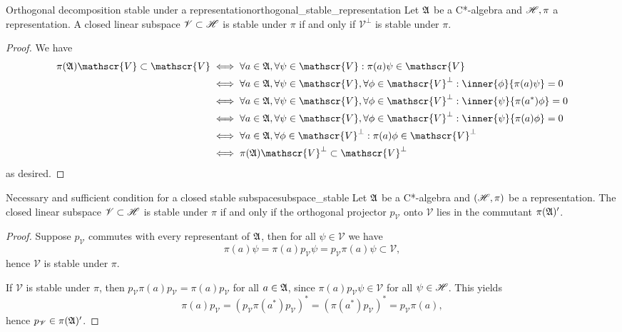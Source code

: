 \begin{proposition}{Orthogonal decomposition stable under a representation}{orthogonal_stable_representation}
    Let \(\mathfrak{A}\) be a C*-algebra and \(\mathscr{H}, \pi\) a representation. A closed linear subspace \(\mathscr{V}\subset \mathscr{H}\) is stable under \(\pi\) if and only if \(\mathscr{V}^{\perp}\) is stable under \(\pi\).
\end{proposition}
\begin{proof}
    We have
    \begin{align*}
        \pi(\algebra{A})\mathscr{V} \subset \mathscr{V}
        &\iff
        \forall a \in \algebra{A}, \forall \psi \in \mathscr{V} : \pi(a)\psi \in \mathscr{V}\\
        &\iff
        \forall a \in \algebra{A}, \forall \psi \in \mathscr{V}, \forall \phi \in \mathscr{V}^{\perp} : \inner{\phi}{\pi(a)\psi} = 0\\
        &\iff
        \forall a \in \algebra{A}, \forall \psi \in \mathscr{V}, \forall \phi \in \mathscr{V}^{\perp}: \inner{\psi}{\pi(a^*)\phi} = 0\\
        &\iff
        \forall a \in \algebra{A}, \forall \psi \in \mathscr{V}, \forall \phi \in \mathscr{V}^{\perp}: \inner{\psi}{\pi(a)\phi} = 0\\
        &\iff
        \forall a \in \algebra{A},\forall \phi \in \mathscr{V}^{\perp} : \pi(a)\phi \in \mathscr{V}^{\perp}\\
        &\iff
        \pi(\algebra{A})\mathscr{V}^{\perp} \subset \mathscr{V}^{\perp}
    \end{align*}
    as desired.
\end{proof}

\begin{proposition}{Necessary and sufficient condition for a closed stable subspace}{subspace_stable}
    Let \(\mathfrak{A}\) be a C*-algebra and \((\mathscr{H}, \pi)\) be a representation. The closed linear subspace \(\mathscr{V} \subset \mathscr{H}\) is stable under \(\pi\) if and only if the orthogonal projector \(p_{\mathscr{V}}\) onto \(\mathscr{V}\) lies in the commutant \(\pi(\mathfrak{A})'\).
\end{proposition}
\begin{proof}
    Suppose \(p_{\mathscr{V}}\) commutes with every representant of \(\mathfrak{A}\), then for all \(\psi \in \mathscr{V}\) we have
    \begin{equation*}
        \pi(a) \psi = \pi(a)p_\mathscr{V} \psi = p_{\mathscr{V}} \pi(a) \psi \subset \mathscr{V},
    \end{equation*}
    hence \(\mathscr{V}\) is stable under \(\pi\).

    If \(\mathscr{V}\) is stable under \(\pi\), then \(p_\mathscr{V} \pi(a) p_{\mathscr{V}} = \pi(a) p_{\mathscr{V}}\) for all \(a \in \mathfrak{A}\), since \(\pi(a) p_{\mathscr{V}}\psi \in \mathscr{V}\) for all \(\psi \in \mathscr{H}\). This yields
    \begin{equation*}
        \pi(a)p_{\mathscr{V}} = (p_{\mathscr{V}}\pi(a^*)p_{\mathscr{V}})^* = (\pi(a^*)p_{\mathscr{V}})^* = p_{\mathscr{V}} \pi(a),
    \end{equation*}
    hence \(p_{\mathscr{V}} \in \pi(\mathfrak{A})'\).
\end{proof}

